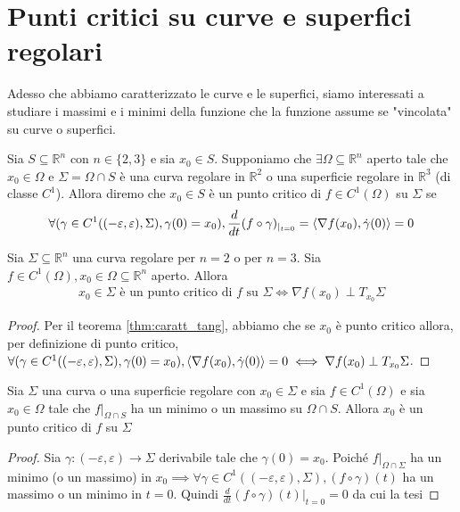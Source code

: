 \section{Punti critici su curve e superfici regolari}
Adesso che abbiamo caratterizzato le curve e le superfici, siamo interessati a studiare i massimi e i minimi della funzione che la funzione assume se "vincolata" su curve o superfici. \\
\begin{definition}
Sia $S \subseteq \mathbb{R}^n$ con $n \in \{ 2, 3 \}$ e sia $x_0 \in S$. Supponiamo che $\exists \Omega \subseteq \mathbb{R}^n$ aperto tale che $x_0 \in \Omega$ e $\Sigma = \Omega \cap S$ è una curva regolare in $\mathbb{R}^2$ o una superficie regolare in $\mathbb{R}^3$ (di classe $C^1$). Allora diremo che $x_0 \in S$ è un punto critico di $f \in C^1(\Omega)$ su $\Sigma$ se
$$
\forall (\gamma \in C^1 ((-\varepsilon, \varepsilon), \Sigma), \gamma(0) = x_0), \frac{d}{dt} (f \circ \gamma)_{|_{t=0}} = \langle \nabla f(x_0), \dot{\gamma}(0) \rangle = 0
$$
\end{definition}
\begin{theorem}
Sia $\Sigma \subseteq \mathbb{R}^n$ una curva regolare per $n=2$ o per $n=3$. Sia $f \in C^1(\Omega), x_0 \in \Omega \subseteq \mathbb{R}^n$ aperto. Allora 
\begin{align*}
x_0 \in \Sigma \text{ è un punto critico di } f \text{ su } \Sigma  \iff \nabla f(x_0) \perp T_{x_0} \Sigma
\end{align*}
\label{thm:punti_crit_su_curve}
\end{theorem}
\begin{proof}
Per il teorema \ref{thm:caratt_tang}, abbiamo che se $x_0$ è punto critico allora, per definizione di punto critico, $\forall (\gamma \in C^1((-\varepsilon, \varepsilon), \Sigma), \gamma(0)=x_0), \langle \nabla f(x_0), \dot{\gamma}(0) \rangle = 0 \iff \nabla f(x_0) \perp T_{x_0} \Sigma$.
\end{proof}
\begin{theorem}
Sia $\Sigma$ una curva o una superficie regolare con $x_0 \in \Sigma$ e sia $f \in C^{1}(\Omega)$ e sia $x_0 \in \Omega$ tale che $f|_{\Omega \cap S}$ ha un minimo o un massimo su $\Omega \cap S$. Allora $x_0$ è un punto critico di $f$ su $\Sigma$
\end{theorem}
\begin{proof}
Sia $\gamma: (-\varepsilon, \varepsilon) \to \Sigma$ derivabile tale che $\gamma(0) = x_0$. Poiché $f|_{\Omega \cap \Sigma}$ ha un minimo (o un massimo) in $x_0 \implies \forall \gamma \in C^{1}((-\varepsilon, \varepsilon), \Sigma), (f \circ \gamma)(t)$ ha un massimo o un minimo in $t = 0$. Quindi $\frac{d}{dt}(f \circ \gamma)(t)|_{t=0} = 0$ da cui la tesi
\end{proof}
